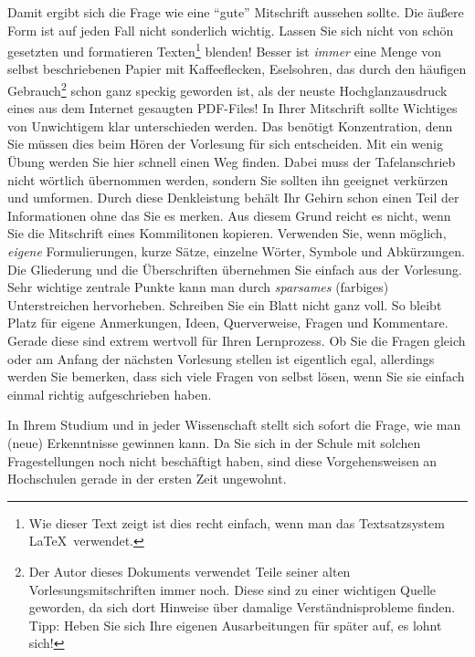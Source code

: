 Damit ergibt sich die Frage wie eine "`gute"' Mitschrift aussehen sollte. Die äußere Form ist
auf jeden Fall nicht sonderlich wichtig. Lassen Sie sich nicht von schön gesetzten und formatieren
Texten\footnote{Wie dieser Text zeigt ist dies recht einfach, wenn man das Textsatzsystem
\LaTeX\ verwendet.} blenden! Besser ist \emph{immer} eine Menge von selbst beschriebenen Papier 
mit Kaffeeflecken, Eselsohren, das durch den häufigen Gebrauch\footnote{Der Autor dieses Dokuments 
verwendet Teile seiner alten Vorlesungsmitschriften immer noch. Diese sind zu einer wichtigen Quelle 
geworden, da sich dort Hinweise über damalige Verständnisprobleme finden. Tipp: Heben Sie sich Ihre 
eigenen Ausarbeitungen für später auf, es lohnt sich!} schon ganz speckig geworden ist, als der neuste 
Hochglanzausdruck eines aus dem Internet gesaugten PDF-Files! In Ihrer Mitschrift sollte Wichtiges 
von Unwichtigem klar unterschieden werden. Das benötigt Konzentration, denn Sie müssen dies beim 
Hören der  Vorlesung für sich entscheiden. Mit ein wenig Übung werden Sie hier schnell einen Weg 
finden. Dabei muss der Tafelanschrieb nicht wörtlich übernommen werden, sondern Sie sollten ihn 
geeignet  verkürzen und umformen. Durch diese Denkleistung behält Ihr Gehirn schon einen Teil der 
Informationen ohne das Sie es merken. Aus diesem Grund reicht es nicht, wenn Sie 
die Mitschrift eines Kommilitonen kopieren. Verwenden Sie, wenn möglich, \emph{eigene}
Formulierungen, kurze Sätze, einzelne Wörter, Symbole und Abkürzungen. Die Gliederung
und die Überschriften übernehmen Sie einfach aus der Vorlesung. Sehr wichtige zentrale
Punkte kann man durch \emph{sparsames} (farbiges) Unterstreichen hervorheben. Schreiben
Sie ein Blatt nicht ganz voll. So bleibt Platz für eigene Anmerkungen, Ideen, Querverweise,
Fragen und Kommentare. Gerade diese sind extrem wertvoll für Ihren Lernprozess.  Ob Sie
die Fragen gleich oder am Anfang der nächsten Vorlesung stellen ist eigentlich egal,
allerdings werden Sie bemerken, dass sich viele Fragen von selbst lösen, wenn Sie sie einfach
einmal richtig aufgeschrieben haben.

\bigskip

In Ihrem Studium und in jeder Wissenschaft stellt sich sofort die Frage, wie man (neue)
Erkenntnisse gewinnen kann.  Da Sie sich in der Schule mit solchen Fragestellungen
noch nicht beschäftigt haben, sind diese Vorgehensweisen an Hochschulen gerade in der 
ersten Zeit ungewohnt. 

